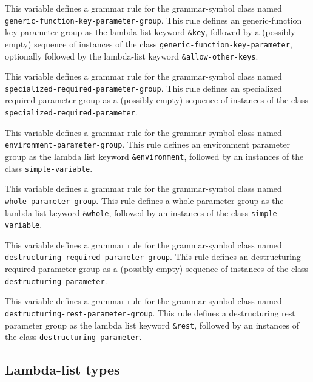 
This variable defines a grammar rule for the grammar-symbol class
named \texttt{generic-function-key-parameter-group}.  This rule
defines an generic-function key parameter group as the lambda list
keyword \texttt{\&key}, followed by a (possibly empty) sequence of
instances of the class \texttt{generic-function-key-parameter},
optionally followed by the lambda-list keyword
\texttt{\&allow-other-keys}.


This variable defines a grammar rule for the grammar-symbol class
named \texttt{specialized-required-parameter-group}.  This rule
defines an specialized required parameter group as a (possibly empty)
sequence of instances of the class
\texttt{specialized-required-parameter}.


This variable defines a grammar rule for the grammar-symbol class
named \texttt{environment-parameter-group}.  This rule defines an
environment parameter group as the lambda list keyword
\texttt{\&environment}, followed by an instances of the class
\texttt{simple-variable}.


This variable defines a grammar rule for the grammar-symbol class
named \texttt{whole-parameter-group}.  This rule defines a whole
parameter group as the lambda list keyword \texttt{\&whole}, followed
by an instances of the class \texttt{simple-variable}.


This variable defines a grammar rule for the grammar-symbol class
named \texttt{destructuring-required-parameter-group}.  This rule
defines an destructuring required parameter group as a (possibly
empty) sequence of instances of the class
\texttt{destructuring-parameter}.


This variable defines a grammar rule for the grammar-symbol class
named \texttt{destructuring-rest-parameter-group}.  This rule defines
a destructuring rest parameter group as the lambda list keyword
\texttt{\&rest}, followed by an instances of the class
\texttt{destructuring-parameter}.

\subsection{Lambda-list types}


